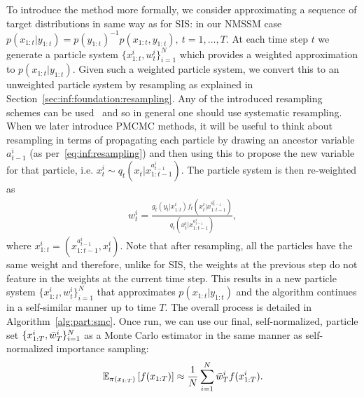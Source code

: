 To introduce the \smc method more formally, we consider approximating a sequence of target distributions
in same way as for SIS: in our NMSSM
 case $p(x_{1:t}|y_{1:t}) = p(y_{1:t})^{-1} p(x_{1:t},y_{1:t}), ~t=1,\ldots,T$. 
At each time step $t$ we 
generate a particle system
$\{x_{1:t}^i,w_{t}^i\}_{i=1}^N$ which provides a weighted approximation  to $p(x_{1:t}|y_{1:t})$. Given such a 
weighted particle system, we convert this to an unweighted particle system by resampling as explained
in Section~\ref{sec:inf:foundation:resampling}.  Any of the introduced resampling schemes can be 
used~\citep[Section 4.1]{andrieu2010particle}
and so in general one should use systematic resampling.
When we later introduce PMCMC methods, it will
be useful to think about resampling in terms of propagating each particle by drawing an 
ancestor variable $a_{t-1}^i$ (as per~\eqref{eq:inf:resampling}) and then using this to propose the new
variable for that particle, i.e. $x_t^i \sim q_t(x_t | x_{1:t-1}^{a_{t-1}^i})$.  The particle system is then
re-weighted as
\begin{align}
\label{eq:part:smcweights}
w_t^i = \frac{g_t(y_t|x_{1:t}^i) f_t(x_t^i | x_{1:t-1}^{a_{t-1}^i})}{q_t(x_t^i|x_{1:t-1}^{a_{t-1}^i})},
\end{align}
where $x_{1:t}^i = (x_{1:t-1}^{a_{t-1}^i},x_t^i)$.   Note that after resampling,
all the particles have the same weight and therefore, unlike for SIS, the weights at the previous step
do not feature in the weights at the current time step.
This results in a new particle system $\{x_{1:t}^i,w_t^i\}_{i=1}^N$ that approximates $p(x_{1:t}|y_{1:t})$
and the algorithm continues in a self-similar manner up to time $T$.
The overall process is detailed in Algorithm~\ref{alg:part:smc}.  Once run, we can use our final, self-normalized,
particle set $\{x_{1:T}^i,\bar w_T^i\}_{i=1}^N$ as a Monte Carlo estimator in the same manner as self-normalized
importance sampling:
\begin{align}
\label{eq:part:smc-est}
\mathbb{E}_{\pi (x_{1:T})} \left[f(x_{1:T})\right] \approx \frac{1}{N} \sum_{i=1}^{N} \bar w_T^i f(x_{1:T}^i).
\end{align}

